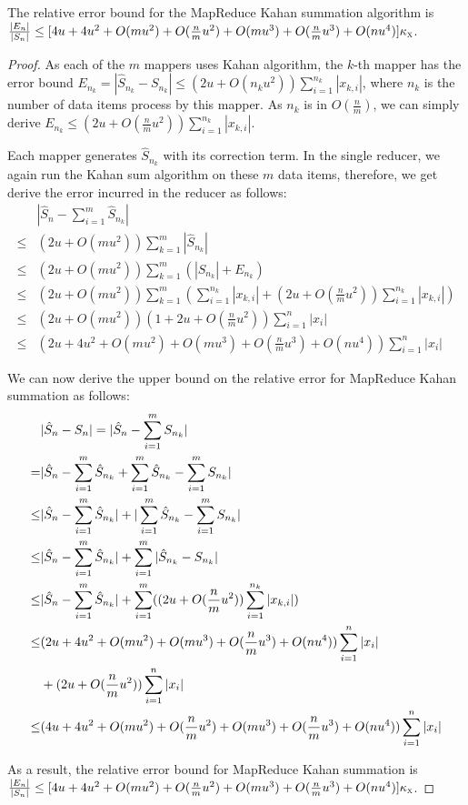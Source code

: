 The relative error bound for the MapReduce Kahan summation algorithm is $\frac{|E_n|}{|S_n|}\leq [4u+4u^2+O(mu^2)+O(\frac{n}{m}u^2)+O(mu^3)+O(\frac{n}{m}u^3)+O(nu^4)]\kappa_\textsc{x} $.

\begin{proof}
As each of the $m$ mappers uses Kahan algorithm, the $k$-th mapper has the error bound $E_{n_k}=|\hat{S}_{n_k}-S_{n_k}|\leq (2u+O(n_ku^2))\sum\limits_{i=1}^{n_k}|x_{k,i}|$, where $n_k$ is the number of data items process by this mapper. As $n_k$ is in $O(\frac{n}{m})$, we can simply derive $E_{n_k}\leq(2u+O(\frac{n}{m}u^2))\sum\limits_{i=1}^{n_k}|x_{k,i}|$.

Each mapper generates $\hat{S}_{n_k}$ with its correction term. In the single reducer, we again run the Kahan sum algorithm on these $m$ data items, therefore, we get derive the error incurred in the reducer as follows:
{
\footnotesize
\begin{align}
&|\hat S_n-\sum\limits_{i=1}^{m}\hat{S}_{n_k}| \nonumber\\
 \leq & (2u+O(mu^2))\sum\limits_{k=1}^{m}|\hat{S}_{n_k}| \nonumber\\
 \leq & (2u+O(mu^2))\sum\limits_{k=1}^{m}(|S_{n_k}|+ E_{n_k})\nonumber\\
 \leq & (2u+O(mu^2))\sum\limits_{k=1}^{m}(\sum\limits_{i=1}^{n_k}|x_{k,i}|+ (2u+O(\frac{n}{m}u^2))\sum\limits_{i=1}^{n_k}|x_{k,i}|) \nonumber \\
\leq & (2u+O(mu^2))(1+2u+O(\frac{n}{m}u^2))\sum\limits_{i=1}^n|x_i| \nonumber \\
\leq & (2u+4u^2+O(mu^2)+O(mu^3)+O(\frac{n}{m}u^3)+O(nu^4))\sum\limits_{i=1}^n|x_i| \nonumber
\end{align}
}

We can now derive the upper bound on the relative error for MapReduce Kahan summation as follows:
{
\footnotesize
\begin{align}
\small 
&|\hat S_n-S_n| = |\hat S_n-\sum\limits_{i=1}^{m}S_{n_k}|\nonumber\\
= &|\hat S_n-\sum\limits_{i=1}^{m}\hat{S}_{n_k}+\sum\limits_{i=1}^{m}\hat{S}_{n_k}-\sum\limits_{i=1}^{m}S_{n_k}|\nonumber\\
\leq & |\hat S_n-\sum\limits_{i=1}^{m}\hat{S}_{n_k}|+|\sum\limits_{i=1}^{m}\hat{S}_{n_k}-\sum\limits_{i=1}^{m}S_{n_k}|\nonumber\\
\leq & |\hat S_n-\sum\limits_{i=1}^{m}\hat{S}_{n_k}|+\sum\limits_{i=1}^{m}|\hat{S}_{n_k}-S_{n_k}|\nonumber\\
\leq & |\hat S_n-\sum\limits_{i=1}^{m}\hat{S}_{n_k}| + \sum\limits_{i=1}^{m}((2u+O(\frac{n}{m}u^2))\sum\limits_{i=1}^{n_k}|x_{k,i}|)\nonumber\\
\leq & (2u+4u^2+O(mu^2)+O(mu^3)+O(\frac{n}{m}u^3)+O(nu^4))\sum\limits_{i=1}^n|x_i| \nonumber\\
& + (2u+O(\frac{n}{m}u^2))\sum\limits_{i=1}^n|x_i| \nonumber \\
\leq & (4u+4u^2+O(mu^2)+O(\frac{n}{m}u^2)+O(mu^3)+O(\frac{n}{m}u^3)+O(nu^4))\sum\limits_{i=1}^n|x_i|\nonumber
\end{align}
}

As a result, the relative error bound for MapReduce Kahan summation is $\frac{|E_n|}{|S_n|}\leq [4u+4u^2+O(mu^2)+O(\frac{n}{m}u^2)+O(mu^3)+O(\frac{n}{m}u^3)+O(nu^4)]\kappa_\textsc{x} $. 
\end{proof}
